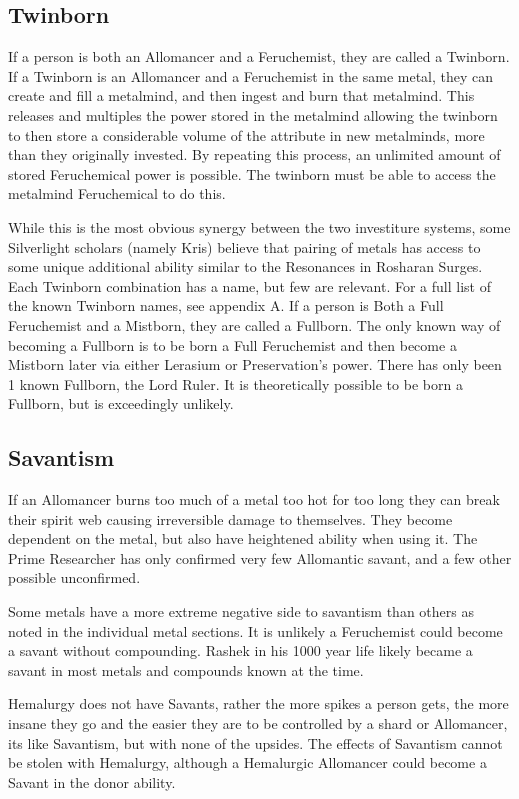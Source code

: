 \documentclass[conference]{IEEEtran}
\begin{document}
\subsection*{Twinborn}
If a person is both an Allomancer and a Feruchemist, they are called a Twinborn.    
If a Twinborn is an Allomancer and a Feruchemist in the same metal, they can create and fill a metalmind, and then ingest and burn that metalmind.  This releases and multiples the power stored in the metalmind allowing the twinborn to then store a considerable volume of the attribute in new metalminds, more than they originally invested.  By repeating this process, an unlimited amount of stored Feruchemical power is possible.  The twinborn must be able to access the metalmind Feruchemical to do this.

While this is the most obvious synergy between the two investiture systems, some Silverlight scholars (namely Kris) believe that pairing of metals has access to some unique additional ability similar to the Resonances in Rosharan Surges.
Each Twinborn combination has a name, but few are relevant.  For a full list of the known Twinborn names, see appendix A.
If a person is Both a Full Feruchemist and a Mistborn, they are called a Fullborn.  The only known way of becoming a Fullborn is to be born a Full Feruchemist and then become a Mistborn later via either Lerasium or Preservation's power.  There has only been 1 known Fullborn, the Lord Ruler. 
It is theoretically possible to be born a Fullborn, but is exceedingly  unlikely.

\subsection*{Savantism}
If an Allomancer burns too much of a metal too hot for too long they can break their spirit web causing irreversible damage to themselves.  They become dependent on the metal, but also have heightened ability when using it.  The Prime Researcher has only confirmed very few Allomantic savant, and a few other possible unconfirmed.

Some metals have a more extreme negative side to savantism than others as noted in the individual metal sections.
It is unlikely a Feruchemist could become a savant without compounding.  Rashek in his 1000 year life likely became a savant in most metals and compounds known at the time.

Hemalurgy does not have Savants, rather the more spikes a person gets, the more insane they go and the easier they are to be controlled by a shard or Allomancer, its like Savantism, but with none of the upsides.  The effects of Savantism cannot be stolen with Hemalurgy, although a Hemalurgic Allomancer could become a Savant in the donor ability.
\end{document}
